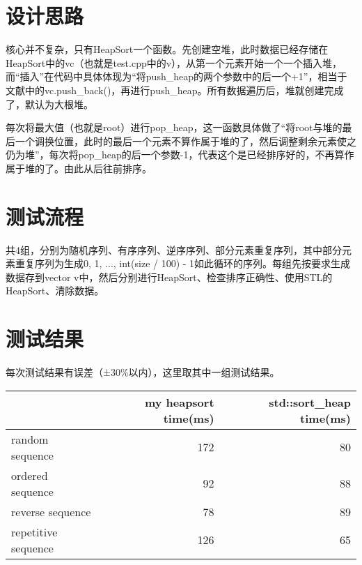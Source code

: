 \documentclass[UTF8]{ctexart}
\begin{document}
\pagestyle{fancy}
\fancyhead{}

\section{设计思路}
核心并不复杂，只有HeapSort一个函数。先创建空堆，此时数据已经存储在HeapSort中的vc（也就是test.cpp中的v），从第一个元素开始一个一个插入堆，而“插入”在代码中具体体现为“将push\_heap的两个参数中的后一个+1”，相当于文献中的vc.push\_back()，再进行push\_heap。所有数据遍历后，堆就创建完成了，默认为大根堆。

每次将最大值（也就是root）进行pop\_heap，这一函数具体做了“将root与堆的最后一个调换位置，此时的最后一个元素不算作属于堆的了，然后调整剩余元素使之仍为堆”，每次将pop\_heap的后一个参数-1，代表这个是已经排序好的，不再算作属于堆的了。由此从后往前排序。
\section{测试流程}
共4组，分别为随机序列、有序序列、逆序序列、部分元素重复序列，其中部分元素重复序列为生成0, 1, ..., int(size / 100) - 1如此循环的序列。每组先按要求生成数据存到vector v中，然后分别进行HeapSort、检查排序正确性、使用STL的HeapSort、清除数据。

\section{测试结果}
每次测试结果有误差（±30\%以内），这里取其中一组测试结果。

\begin{tabular}{|l|r|r|}
\hline
\textbf{} & \textbf{my heapsort time(ms)} & \textbf{std::sort\_heap time(ms)} \\ \hline
random sequence & 172 & 80 \\ \hline
ordered sequence & 92 & 88 \\ \hline
reverse sequence & 78 & 89 \\ \hline
repetitive sequence & 126 & 65 \\ \hline
\end{tabular}
    
\end{document}
